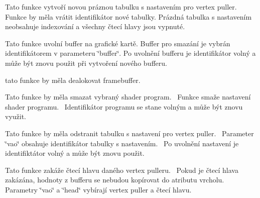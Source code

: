 \begin{DoxyRefList}
\item[\label{todo__todo000008}%
\Hypertarget{todo__todo000008}%
Global \hyperlink{group__vertexpuller__tasks_gaabe965c10fea7cd8f8af3aa528915c92}{G\+PU\+:\+:create\+Vertex\+Puller} ()]Tato funkce vytvoří novou práznou tabulku s nastavením pro vertex puller.~\newline
 Funkce by měla vrátit identifikátor nové tabulky. Prázdná tabulka s nastavením neobsahuje indexování a všechny čtecí hlavy jsou vypnuté.  
\item[\label{todo__todo000004}%
\Hypertarget{todo__todo000004}%
Global \hyperlink{group__buffer__tasks_ga05fb19b7c8b51a92162517aa7f25a166}{G\+PU\+:\+:delete\+Buffer} (Buffer\+ID buffer)]Tato funkce uvolní buffer na grafické kartě. Buffer pro smazání je vybrán identifikátorem v parameteru \char`\"{}buffer\char`\"{}. Po uvolnění bufferu je identifikátor volný a může být znovu použit při vytvoření nového bufferu.  
\item[\label{todo__todo000029}%
\Hypertarget{todo__todo000029}%
Global \hyperlink{group__framebuffer__tasks_gaaaa9fbf5f3c28f27f092c2c6883d6e60}{G\+PU\+:\+:delete\+Framebuffer} ()]tato funkce by měla dealokovat framebuffer.  
\item[\label{todo__todo000018}%
\Hypertarget{todo__todo000018}%
Global \hyperlink{group__program__tasks_ga3f8363f9c27c3f900f258e6acee52683}{G\+PU\+:\+:delete\+Program} (Program\+ID prg)]Tato funkce by měla smazat vybraný shader program.~\newline
 Funkce smaže nastavení shader programu.~\newline
 Identifikátor programu se stane volným a může být znovu využit.~\newline
  
\item[\label{todo__todo000009}%
\Hypertarget{todo__todo000009}%
Global \hyperlink{group__vertexpuller__tasks_gadf91a9fec77d8d23f093458b36a733fc}{G\+PU\+:\+:delete\+Vertex\+Puller} (Vertex\+Puller\+ID vao)]Tato funkce by měla odstranit tabulku s nastavení pro vertex puller.~\newline
 Parameter \char`\"{}vao\char`\"{} obsahuje identifikátor tabulky s nastavením.~\newline
 Po uvolnění nastavení je identifiktátor volný a může být znovu použit.~\newline
  
\item[\label{todo__todo000013}%
\Hypertarget{todo__todo000013}%
Global \hyperlink{group__vertexpuller__tasks_gae95cab56d80cb888e71b25965dc868c5}{G\+PU\+:\+:disable\+Vertex\+Puller\+Head} (Vertex\+Puller\+ID vao, uint32\+\_\+t head)]Tato funkce zakáže čtecí hlavu daného vertex pulleru.~\newline
 Pokud je čtecí hlava zakázána, hodnoty z bufferu se nebudou kopírovat do atributu vrcholu.~\newline
 Parametry \char`\"{}vao\char`\"{} a \char`\"{}head\char`\"{} vybírají vertex puller a čtecí hlavu.~\newline
  

\end{DoxyRefList}
